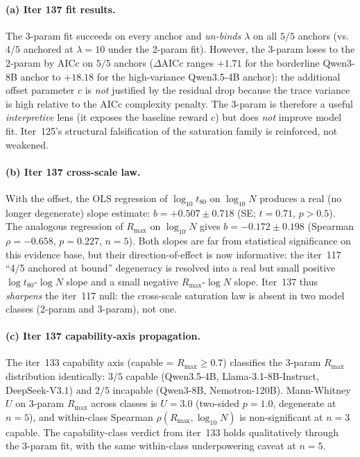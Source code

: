 \documentclass{article}
\begin{document}
\paragraph{(a) Iter 137 fit results.}
\label{par:scaling-iter137-fits}

The 3-param fit succeeds on every anchor and \emph{un-binds
$\lambda$} on all $5/5$ anchors (vs.~$4/5$ anchored at $\lambda=10$
under the 2-param fit).  However, the 3-param loses to the
2-param by AICc on $5/5$ anchors ($\Delta\mathrm{AICc}$ ranges
$+1.71$ for the borderline Qwen3-8B anchor to $+18.18$ for the
high-variance Qwen3.5-4B anchor): the additional offset parameter
$c$ is \emph{not} justified by the residual drop because the
trace variance is high relative to the AICc complexity penalty.
The 3-param is therefore a useful \emph{interpretive} lens (it
exposes the baseline reward $c$) but does \emph{not} improve
model fit.  Iter~125's structural falsification of the
saturation family is reinforced, not weakened.

\paragraph{(b) Iter 137 cross-scale law.}
\label{par:scaling-iter137-cross-scale}

With the offset, the OLS regression of $\log_{10} t_{80}$ on
$\log_{10} N$ produces a real (no longer degenerate) slope
estimate: $b = +0.507 \pm 0.718$ (SE; $t = 0.71$, $p > 0.5$).
The analogous regression of $R_{\max}$ on $\log_{10} N$ gives
$b = -0.172 \pm 0.198$ (Spearman $\rho = -0.658$, $p = 0.227$,
$n = 5$).  Both slopes are far from statistical significance on
this evidence base, but their direction-of-effect is now
informative: the iter~117 ``4/5 anchored at bound'' degeneracy is
resolved into a real but small positive $\log t_{80}$-$\log N$
slope and a small negative $R_{\max}$-$\log N$ slope.  Iter~137
thus \emph{sharpens} the iter~117 null: the cross-scale
saturation law is absent in two model classes (2-param and
3-param), not one.

\paragraph{(c) Iter 137 capability-axis propagation.}
\label{par:scaling-iter137-capability}

The iter~133 capability axis (capable = $R_{\max} \ge 0.7$)
classifies the 3-param $R_{\max}$ distribution identically:
$3/5$ capable (Qwen3.5-4B, Llama-3.1-8B-Instruct,
DeepSeek-V3.1) and $2/5$ incapable (Qwen3-8B, Nemotron-120B).
Mann-Whitney $U$ on 3-param $R_{\max}$ across classes is
$U = 3.0$ (two-sided $p = 1.0$, degenerate at $n = 5$), and
within-class Spearman $\rho(R_{\max}, \log_{10} N)$ is
non-significant at $n = 3$ capable.  The capability-class
verdict from iter~133 holds qualitatively through the 3-param
fit, with the same within-class underpowering caveat at
$n = 5$.
\end{document}
